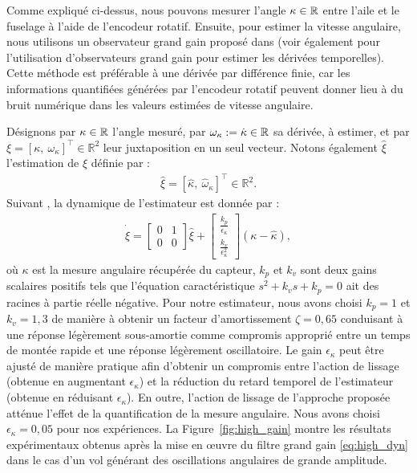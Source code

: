 Comme expliqué ci-dessus, nous pouvons mesurer l'angle $\kappa \in {\mathbb R}$ entre l'aile et le fuselage à l'aide de l'encodeur rotatif. Ensuite, pour estimer la vitesse angulaire, nous utilisons un observateur grand gain proposé dans \cite{203613} (voir également \cite{1032320} pour l'utilisation d'observateurs grand gain pour estimer les dérivées temporelles). Cette méthode est préférable à une dérivée par différence finie, car les informations quantifiées générées par l'encodeur rotatif peuvent donner lieu à du bruit numérique dans les valeurs estimées de vitesse angulaire.


Désignons par $\kappa \in {\mathbb R}$ l'angle mesuré, par $\omega_{\kappa} := \dot \kappa  \in {\mathbb R}$ sa dérivée, à estimer, et par $\xi = [\kappa,~\omega_{\kappa}]^\top \in \mathbb{R}^2$ leur juxtaposition en un seul vecteur. Notons également $\hat{\xi}$ l'estimation de $\xi$ définie par :
\begin{align*}
    \hat{\xi} = [\hat{\kappa},~\hat{\omega}_{\kappa}]^\top \in \mathbb{R}^2.
\end{align*}
Suivant \cite{203613}, la dynamique de l'estimateur est donnée par :
\begin{align}
\label{eq:high_dyn}
    \dot{\hat{\xi}} =  \begin{bmatrix}0 & 1 \\ 0 & 0 \end{bmatrix} \hat{\xi}+ \begin{bmatrix}\frac{k_{p}}{\epsilon_{\kappa}}  \\ \frac{k_{v}}{\epsilon_{\kappa}^{2}}  \end{bmatrix} (\kappa - \hat{\kappa}),
\end{align}
où $\kappa$ est la mesure angulaire récupérée du capteur, $k_{p}$ et $k_{v}$ sont deux gains scalaires positifs tels que l'équation caractéristique $s^{2} + k_{v} s + k_{p} = 0$ ait des racines à partie réelle négative. Pour notre estimateur, nous avons choisi $k_{p} = 1$ et $k_{v} = 1,3$ de manière à obtenir un facteur d'amortissement $\zeta = 0,65$ conduisant à une réponse légèrement sous-amortie comme compromis approprié entre un temps de montée rapide et une réponse légèrement oscillatoire. Le gain $\epsilon_{\kappa}$ peut être ajusté de manière pratique afin d'obtenir un compromis entre l'action de lissage (obtenue en augmentant $\epsilon_{\kappa}$) et la réduction du retard temporel
de l'estimateur (obtenue en réduisant $\epsilon_{\kappa}$). En outre, l'action de lissage de l'approche proposée atténue l'effet de la quantification de la mesure angulaire. Nous avons choisi $\epsilon_{\kappa} = 0,05$ pour nos expériences. La Figure~\ref{fig:high_gain} montre les résultats expérimentaux obtenus après la mise en œuvre du filtre grand gain \eqref{eq:high_dyn} dans le cas d'un vol générant des oscillations angulaires de grande amplitude.

